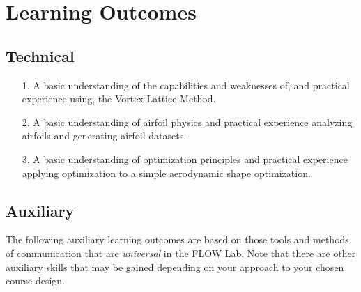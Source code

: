 \documentclass[12pt]{article}
\begin{document}
\section{Learning Outcomes}
\label{sec:learningoutcomes}


\subsection{Technical}
\label{ssec:technicaloutcomes}

\begin{enumerate}
	\item[1.] A basic understanding of the capabilities and weaknesses of, and practical experience using, the Vortex Lattice Method.
	\item[2.] A basic understanding of airfoil physics and practical experience analyzing airfoils and generating airfoil datasets.
	\item[3.] A basic understanding of optimization principles and practical experience applying optimization to a simple aerodynamic shape optimization.
\end{enumerate}


\subsection{Auxiliary}
\label{ssec:auxiliaryoutcomes}

The following auxiliary learning outcomes are based on those tools and methods of communication that are \textit{universal} in the FLOW Lab.  Note that there are other auxiliary skills that may be gained depending on your approach to your chosen course design.
\end{document}
